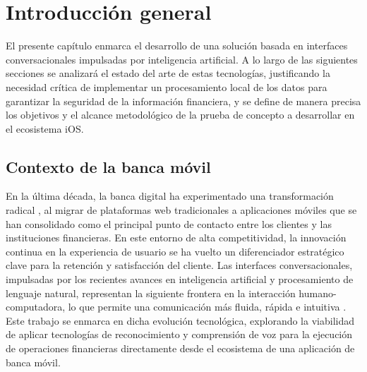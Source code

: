 
\chapter{Introducción general} %

\label{Chapter1} %
\label{IntroGeneral}

El presente capítulo enmarca el desarrollo de una solución basada en interfaces conversacionales impulsadas por inteligencia artificial. A lo largo de las siguientes secciones se analizará el estado del arte de estas tecnologías, justificando la necesidad crítica de implementar un procesamiento local de los datos para garantizar la seguridad de la información financiera, y se define de manera precisa los objetivos y el alcance metodológico de la prueba de concepto a desarrollar en el ecosistema iOS.


\newcommand{\keyword}[1]{\textbf{#1}}
\newcommand{\tabhead}[1]{\textbf{#1}}
\newcommand{\code}[1]{\texttt{#1}}
\newcommand{\file}[1]{\texttt{\bfseries#1}}
\newcommand{\option}[1]{\texttt{\itshape#1}}
\newcommand{\grados}{$^{\circ}$}


\section{Contexto de la banca móvil{}}

En la última década, la banca digital ha experimentado una transformación radical \citep{ARTICLE:1}, al migrar de plataformas web tradicionales a aplicaciones móviles que se han consolidado como el principal punto de contacto entre los clientes y las instituciones financieras. En este entorno de alta competitividad, la innovación continua en la experiencia de usuario se ha vuelto un diferenciador estratégico clave para la retención y satisfacción del cliente. Las interfaces conversacionales, impulsadas por los recientes avances en inteligencia artificial y procesamiento de lenguaje natural, representan la siguiente frontera en la interacción humano-computadora, lo que permite una comunicación más fluida, rápida e intuitiva \citep{ARTICLE:2}. Este trabajo se enmarca en dicha evolución tecnológica, explorando la viabilidad de aplicar tecnologías de reconocimiento y comprensión de voz para la ejecución de operaciones financieras directamente desde el ecosistema de una aplicación de banca móvil.

